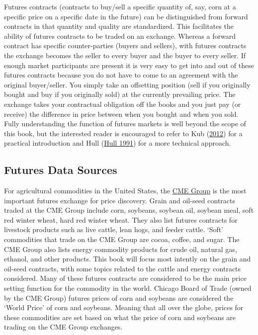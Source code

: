 \documentclass[
]{book}
\begin{document}
Futures contracts (contracts to buy/sell a specific quantity of, say, corn at a specific price on a specific date in the future) can be distinguished from forward contracts in that quantity and quality are standardized. This facilitates the ability of futures contracts to be traded on an exchange. Whereas a forward contract has specific counter-parties (buyers and sellers), with futures contracts the exchange becomes the seller to every buyer and the buyer to every seller. If enough market participants are present it is very easy to get into and out of these futures contracts because you do not have to come to an agreement with the original buyer/seller. You simply take an offsetting position (sell if you originally bought and buy if you originally sold) at the currently prevailing price. The exchange takes your contractual obligation off the books and you just pay (or receive) the difference in price between when you bought and when you sold. Fully understanding the function of futures markets is well beyond the scope of this book, but the interested reader is encouraged to refer to Kub (\protect\hyperlink{ref-kub2012Mastering}{2012}) for a practical introduction and Hull (\protect\hyperlink{ref-hull1991introduction}{Hull 1991}) for a more technical approach.

\hypertarget{futures-data-sources}{%
\subsection{Futures Data Sources}\label{futures-data-sources}}

For agricultural commodities in the United States, the \href{http://www.cmegroup.com/}{CME Group} is the most important futures exchange for price discovery. Grain and oil-seed contracts traded at the CME Group include corn, soybeans, soybean oil, soybean meal, soft red winter wheat, hard red winter wheat. They also list futures contracts for livestock products such as live cattle, lean hogs, and feeder cattle. `Soft' commodities that trade on the CME Group are cocoa, coffee, and sugar. The CME Group also lists energy commodity products for crude oil, natural gas, ethanol, and other products. This book will focus most intently on the grain and oil-seed contracts, with some topics related to the cattle and energy contracts considered. Many of these futures contracts are considered to be the main price setting function for the commodity in the world. Chicago Board of Trade (owned by the CME Group) futures prices of corn and soybeans are considered the `World Price' of corn and soybeans. Meaning that all over the globe, prices for these commodities are set based on what the price of corn and soybeans are trading on the CME Group exchanges.
\end{document}
